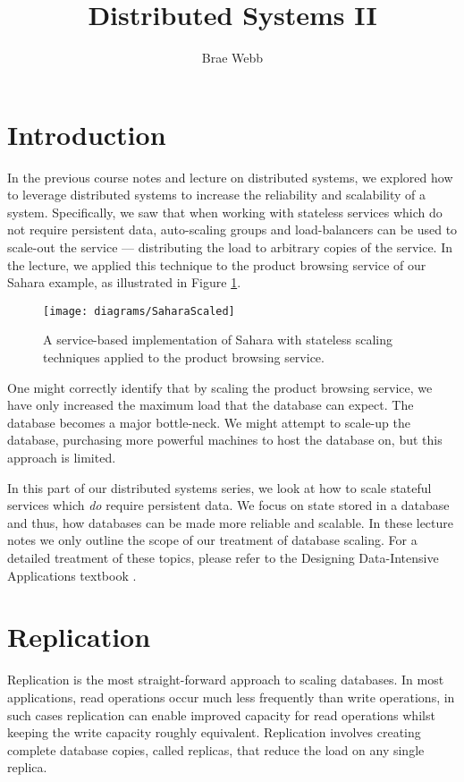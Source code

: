 \title{Distributed Systems II}
\author{Brae Webb}
\date{}

\maketitle

\section{Introduction}
In the previous course notes \cite{distributed1-notes} and lecture \cite{distributed1-slides} on distributed systems,
we explored how to leverage distributed systems to increase the reliability and scalability of a system.
Specifically, we saw that when working with stateless services which do not require persistent data,
auto-scaling groups and load-balancers can be used to scale-out the service --- distributing the load to arbitrary copies of the service.
In the lecture, we applied this technique to the product browsing service of our Sahara example,
as illustrated in Figure \ref{fig:scaled-sahara}.

\begin{figure}[H]
\begin{center}
\texttt{[image: diagrams/SaharaScaled]}
\end{center}
\caption{A service-based implementation of Sahara with stateless scaling techniques applied to the product browsing service.}
\label{fig:scaled-sahara}
\end{figure}

One might correctly identify that by scaling the product browsing service,
we have only increased the maximum load that the database can expect.
The database becomes a major bottle-neck.
We might attempt to scale-up the database,
purchasing more powerful machines to host the database on,
but this approach is limited.

In this part of our distributed systems series,
we look at how to scale stateful services which \textsl{do} require persistent data.
We focus on state stored in a database and thus,
how databases can be made more reliable and scalable.
In these lecture notes we only outline the scope of our treatment of database scaling.
For a detailed treatment of these topics,
please refer to the Designing Data-Intensive Applications textbook \cite{data-intensive}.

\section{Replication}
Replication is the most straight-forward approach to scaling databases.
In most applications,
read operations occur much less frequently than write operations,
in such cases replication can enable improved capacity for read operations whilst keeping the write capacity roughly equivalent.
Replication involves creating complete database copies,
called replicas,
that reduce the load on any single replica.

